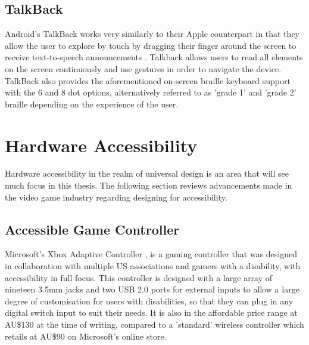 
\subsection{TalkBack}

Android's TalkBack works very similarly to their Apple counterpart in that they allow the user to explore by touch by dragging their finger around the screen to receive text-to-speech announcements \cite{android}.
Talkback allows users to read all elements on the screen continuously and use gestures in order to navigate the device. %
TalkBack also provides the aforementioned on-screen braille keyboard support with the 6 and 8 dot options, alternatively referred to as 'grade 1' and 'grade 2' braille depending on the experience of the user.

\section{Hardware Accessibility}

Hardware accessibility in the realm of universal design is an area that will see much focus in this thesis. %
The following section reviews advancements made in the video game industry regarding designing for accessibility.

\subsection{Accessible Game Controller}

Microsoft's Xbox Adaptive Controller \cite{adaptive}, is a gaming controller that was designed in collaboration with multiple US associations and gamers with a disability, with accessibility in full focus.
This controller is designed with a large array of nineteen 3.5mm jacks and two USB 2.0 ports for external inputs \cite{adaptive} to allow a large degree of customisation for users with disabilities, so that they can plug in any digital switch input to suit their needs.
It is also in the affordable price range at AU\$130 \cite{accessiblecontroller} at the time of writing, compared to a 'standard' wireless controller which retails at AU\$90 \cite{standardcontroller} on Microsoft's online store.

